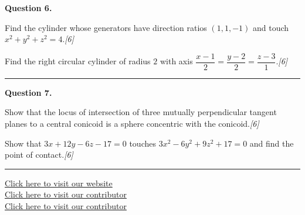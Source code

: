 \documentclass[11pt,a4paper]{article}
\newcommand{\pts}[1]{\hfill   \textit{[#1]}}
\begin{document}
\medskip


\noindent   \textbf{Question 6.}

\begin{parts}
  \item Find the cylinder whose generators have direction ratios $(1,1,-1)$ and touch $x^2+y^2+z^2=4$.\pts{6}
  \item Find the right circular cylinder of radius $2$ with axis $\dfrac{x-1}{2}=\dfrac{y-2}{2}=\dfrac{z-3}{1}$.\pts{6}
\end{parts}
\medskip\rule{\linewidth}{0.2pt}

\medskip


\noindent   \textbf{Question 7.}

\begin{parts}
  \item Show that the locus of intersection of three mutually perpendicular tangent planes to a central conicoid is a sphere concentric with the conicoid.\pts{6}
  \item Show that $3x+12y-6z-17=0$ touches $3x^2-6y^2+9z^2+17=0$ and find the point of contact.\pts{6}
\end{parts}

\vfill\rule{\linewidth}{0.4pt}

\begin{center}\small
\href{https://bhu-exam.vercel.app/}{Click here to visit our website}\\[4pt]
\href{https://me-aryan.vercel.app/}{Click here to visit our contributor}\\[4pt]
\href{https://quashan-me.vercel.app/}{Click here to visit our contributor}
\end{center}
\end{document}
